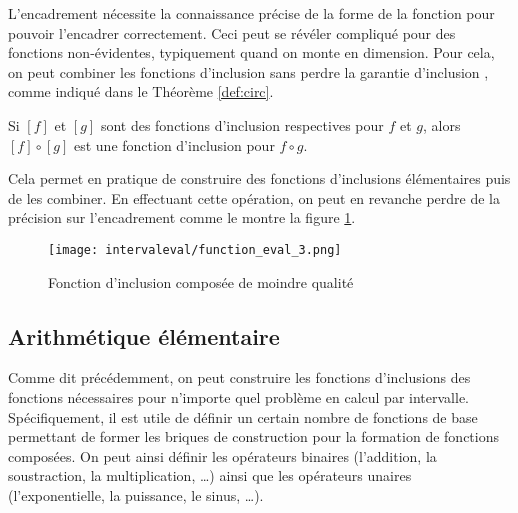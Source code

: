 
\medbreak

L'encadrement nécessite la connaissance précise de la forme de la fonction pour pouvoir l'encadrer correctement. Ceci peut se révéler compliqué pour des fonctions non-évidentes, typiquement quand on monte en dimension. Pour cela, on peut combiner les fonctions d'inclusion sans perdre la garantie d'inclusion \cite{neumaier91, Delanoue18} , comme indiqué dans le Théorème \ref{def:circ}.

\begin{theoreme}
  \label{def:circ}
  Si $[f]$ et $[g]$ sont des fonctions d'inclusion respectives pour $f$ et $g$, alors $[f] \circ [g]$ est une fonction d'inclusion pour $f \circ g$.
\end{theoreme}

Cela permet en pratique de construire des fonctions d'inclusions élémentaires puis de les combiner. En effectuant cette opération, on peut en revanche perdre de la précision sur l'encadrement comme le montre la figure \ref{fig:fct3}.

\begin{figure}[H]
  \centering
  \texttt{[image: intervaleval/function\_eval\_3.png]}
  \caption{Fonction d'inclusion composée de moindre qualité}
  \label{fig:fct3}
\end{figure}


\subsection{Arithmétique élémentaire}

Comme dit précédemment, on peut construire les fonctions d'inclusions des fonctions nécessaires pour n'importe quel problème en calcul par intervalle. Spécifiquement, il est utile de définir un certain nombre de fonctions de base permettant de former les briques de construction pour la formation de fonctions composées. On peut ainsi définir les opérateurs binaires (l'addition, la soustraction, la multiplication, \dots) ainsi que les opérateurs unaires (l'exponentielle, la puissance, le sinus, \dots).

